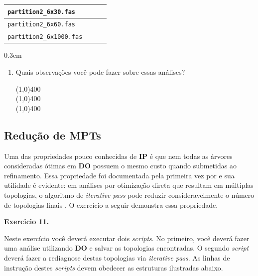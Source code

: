 \begin{refsection}
\begin{center}
\begin{longtable}{|l|c|c|c|}
\hline \texttt{partition2\_6x30.fas} &  & & \\
\hline \texttt{partition2\_6x60.fas} &  & & \\
\hline \texttt{partition2\_6x1000.fas} &  & & \\

\end{longtable}
\end{center}


\begin {myindentpar}{0.3cm}
\begin{enumerate}[\itshape i.]
	\item{Quais observações você pode fazer sobre essas análises?}

\begin{center}
\line(1,0){400}\\
\line(1,0){400}\\
\line(1,0){400}\\
\end{center}

\end{enumerate}
\end{myindentpar}

\subsection{Redução de MPTs}\label{tut11:ip:mpt}

Uma das propriedades pouco conhecidas de \textbf{IP} é que nem todas as árvores consideradas ótimas em \textbf{DO} possuem o mesmo custo quando submetidas ao refinamento. Essa propriedade foi documentada pela primeira vez por \textcite{Machado_and_Marques_2013} e sua utilidade é evidente: em análises por otimização direta que resultam em múltiplas topologias, o algoritmo de \textit{iterative pass} pode reduzir consideravelmente o número de topologias finais \parencite[veja também ][]{Caira_et_al_2013,Pinto-da-Rocha_et_al_2014}. O exercício a seguir demonstra essa propriedade.\\

\begin{blackBlock}{\textbf{Exercicio 11.}}\label{tut11:ex:11.2}

Neste exercício você deverá executar dois \textit{scripts}. No primeiro, você deverá fazer uma análise utilizando \textbf{DO} e salvar as topologias encontradas. O segundo \textit{script} deverá fazer a rediagnose destas topologias via \textit{iterative pass}. As linhas de instrução destes \textit{scripts} devem obedecer as estruturas ilustradas abaixo.


\end{blackBlock}
\end{refsection}
